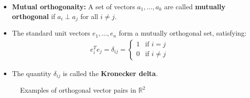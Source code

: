 \begin{frame}{}
\begin{itemize}
    \item \textbf{Mutual orthogonaity:} A set of vectors $a_1, \ldots, a_k$ are called \textbf{mutually orthogonal} if $a_i \perp a_j$ for all $i \neq j$.
    \item The standard unit vectors $e_1, \ldots, e_n$ form a mutually orthogonal set, satisfying:
    \begin{align}
        e_i^T e_j = \delta_{ij} = \begin{cases}
             1 & \text{if } i = j \\
             0 & \text{if } i \neq j
        \end{cases}
    \end{align}
    \item The quantity $\delta_{ij}$ is called the \textbf{Kronecker delta}.
\end{itemize}
\end{frame}
\begin{frame}
    \begin{figure}
        \begin{center}
    \end{center}
    \caption{Examples of orthogonal vector pairs in $\mathbb{R}^2$}
    \end{figure}
\end{frame}

